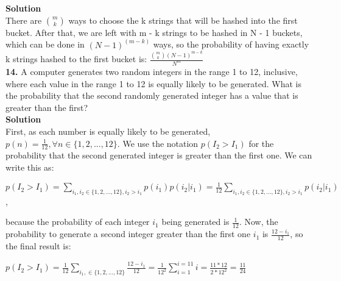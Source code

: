 \documentclass[10pt,a4paper,oneside,draft]{report}
\begin{document}
\textbf{Solution} \\
There are $m \choose k$ ways to choose the k strings that will be hashed into the first bucket. After that, we are left with m - k strings to be hashed in N - 1 buckets, which can be done in $(N-1)^(m-k)$ ways, so the probability of having exactly k strings hashed to the first bucket is: $\frac{{m \choose k} {(N-1)^{m-k}} }{N^m}$ \\

\textbf{14.} A computer generates two random integers in the range 1 to 12, inclusive, where each value in the range 1 to 12 is equally likely to be generated. What is the probability that the second randomly generated integer has a value that is greater than the first? \\

\textbf{Solution} \\

First, as each number is equally likely to be generated, $p(n) = \frac{1}{12}, \forall n \in \{1, 2, ..., 12\} $. We use the notation $p(I_2 > I_1)$ for the probability that the second generated integer is greater than the first one. We can write this as: \\
\begin{center}
$p(I_2 > I_1) = \sum_{i_1, i_2 \in \{1, 2, ..., 12\}, i_2 > i_1} p(i_1) p(i_2 \vert i_1) = \frac{1}{12} \sum_{i_1, i_2 \in \{1, 2, ..., 12\}, i_2 > i_1} p(i_2 \vert i_1)$,    
\end{center} because the probability of each integer $i_1$ being generated is $\frac{1}{12}$.
Now, the probability to generate a second integer greater than the first one $i_1$ is $\frac{12 - i_1}{12}$, so the final result is:\\
\begin{center}
$p(I_2 > I_1) = \frac{1}{12} \sum_{i_1, \in \{1, 2, ..., 12\}} \frac{12 - i_1}{12} =  \frac{1}{12^2} \sum_{i=1}^{i=11} i = 
\frac{11 * 12}{2 * 12^2} = \frac{11}{24}$
\end{center}
\end{document}
